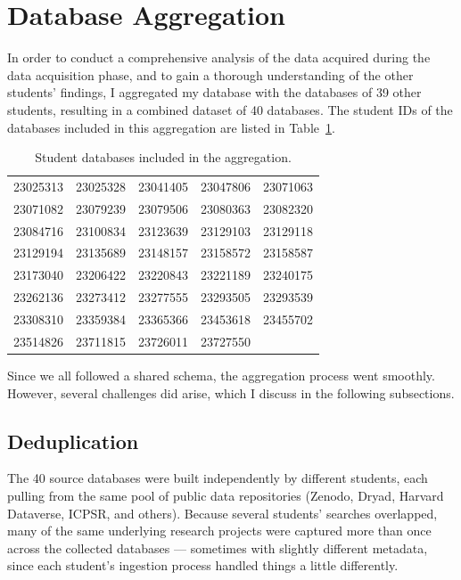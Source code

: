\section{Database Aggregation}

In order to conduct a comprehensive analysis of the data acquired during the data acquisition phase, and to gain a thorough understanding of the other students' findings, I aggregated my database with the databases of 39 other students, resulting in a combined dataset of 40 databases. The student IDs of the databases included in this aggregation are listed in Table~\ref{tab:student-databases}.

\begin{table}[H]
\centering
\caption{Student databases included in the aggregation.}
\label{tab:student-databases}
\renewcommand{\arraystretch}{1.3}
\begin{tabular}{ccccc}
\toprule
23025313 & 23025328 & 23041405 & 23047806 & 23071063 \\
23071082 & 23079239 & 23079506 & 23080363 & 23082320 \\
23084716 & 23100834 & 23123639 & 23129103 & 23129118 \\
23129194 & 23135689 & 23148157 & 23158572 & 23158587 \\
23173040 & 23206422 & 23220843 & 23221189 & 23240175 \\
23262136 & 23273412 & 23277555 & 23293505 & 23293539 \\
23308310 & 23359384 & 23365366 & 23453618 & 23455702 \\
23514826 & 23711815 & 23726011 & 23727550 &          \\
\bottomrule
\end{tabular}
\end{table}

Since we all followed a shared schema, the aggregation process went smoothly. However, several challenges did arise, which I discuss in the following subsections.

\subsection{Deduplication}

The 40 source databases were built independently by different students, each pulling from the same pool of public data repositories (Zenodo, Dryad, Harvard Dataverse, ICPSR, and others). Because several students' searches overlapped, many of the same underlying research projects were captured more than once across the collected databases --- sometimes with slightly different metadata, since each student's ingestion process handled things a little differently.

